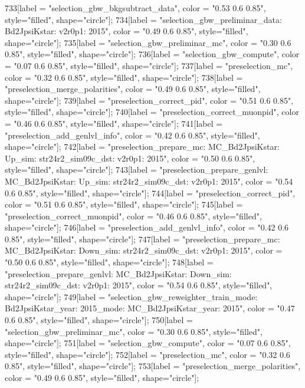 {	733[label = "selection_gbw_bkgsubtract_data", color = "0.53 0.6 0.85", style="filled", shape="circle"];
	734[label = "selection_gbw_preliminar_data\nmode: Bd2JpsiKstar\nversion: v2r0p1\nyear: 2015", color = "0.49 0.6 0.85", style="filled", shape="circle"];
	735[label = "selection_gbw_preliminar_mc", color = "0.30 0.6 0.85", style="filled", shape="circle"];
	736[label = "selection_gbw_compute", color = "0.07 0.6 0.85", style="filled", shape="circle"];
	737[label = "preselection_mc", color = "0.32 0.6 0.85", style="filled", shape="circle"];
	738[label = "preselection_merge_polarities", color = "0.49 0.6 0.85", style="filled", shape="circle"];
	739[label = "preselection_correct_pid", color = "0.51 0.6 0.85", style="filled", shape="circle"];
	740[label = "preselection_correct_muonpid", color = "0.46 0.6 0.85", style="filled", shape="circle"];
	741[label = "preselection_add_genlvl_info", color = "0.42 0.6 0.85", style="filled", shape="circle"];
	742[label = "preselection_prepare_mc\nmode: MC_Bd2JpsiKstar\npolarity: Up\nstrip_sim: str24r2_sim09c_dst\nversion: v2r0p1\nyear: 2015", color = "0.50 0.6 0.85", style="filled", shape="circle"];
	743[label = "preselection_prepare_genlvl\nmode: MC_Bd2JpsiKstar\npolarity: Up\nstrip_sim: str24r2_sim09c_dst\nversion: v2r0p1\nyear: 2015", color = "0.54 0.6 0.85", style="filled", shape="circle"];
	744[label = "preselection_correct_pid", color = "0.51 0.6 0.85", style="filled", shape="circle"];
	745[label = "preselection_correct_muonpid", color = "0.46 0.6 0.85", style="filled", shape="circle"];
	746[label = "preselection_add_genlvl_info", color = "0.42 0.6 0.85", style="filled", shape="circle"];
	747[label = "preselection_prepare_mc\nmode: MC_Bd2JpsiKstar\npolarity: Down\nstrip_sim: str24r2_sim09c_dst\nversion: v2r0p1\nyear: 2015", color = "0.50 0.6 0.85", style="filled", shape="circle"];
	748[label = "preselection_prepare_genlvl\nmode: MC_Bd2JpsiKstar\npolarity: Down\nstrip_sim: str24r2_sim09c_dst\nversion: v2r0p1\nyear: 2015", color = "0.54 0.6 0.85", style="filled", shape="circle"];
	749[label = "selection_gbw_reweighter_train\ndata_mode: Bd2JpsiKstar\ndata_year: 2015\nmc_mode: MC_Bd2JpsiKstar\nmc_year: 2015", color = "0.47 0.6 0.85", style="filled", shape="circle"];
	750[label = "selection_gbw_preliminar_mc", color = "0.30 0.6 0.85", style="filled", shape="circle"];
	751[label = "selection_gbw_compute", color = "0.07 0.6 0.85", style="filled", shape="circle"];
	752[label = "preselection_mc", color = "0.32 0.6 0.85", style="filled", shape="circle"];
	753[label = "preselection_merge_polarities", color = "0.49 0.6 0.85", style="filled", shape="circle"];
}
